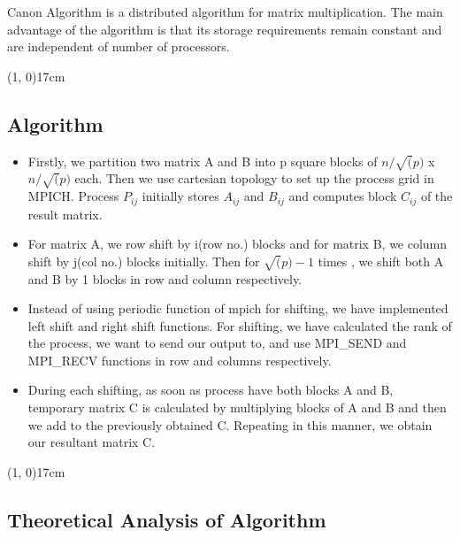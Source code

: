 \documentclass[10pt]{article}
\begin{document}
Canon Algorithm is a distributed algorithm for matrix multiplication. The main advantage of the algorithm is that its storage requirements remain constant and are independent of number of processors.

\begin{center}
	\line(1, 0){17cm}
\end{center}

\begin{center}
  \section*{Algorithm}
\end{center}

\begin{itemize} 

\item Firstly, we partition two matrix A and B into p square blocks of $n/\sqrt(p)$ x $n/\sqrt(p)$ each. Then we use cartesian topology to set up the process grid in MPICH. Process $P_{ij}$ initially stores $A_{ij}$ and $B_{ij}$ and computes block $C_{ij}$ of the result matrix.

\item For matrix A, we row shift by i(row no.) blocks and for matrix B, we column shift by j(col no.) blocks initially. Then for $\sqrt(p)-1 $ times , we shift both A and B by 1 blocks in row and column respectively.

\item Instead of using periodic function of mpich for shifting, we have implemented left shift and right shift functions. For shifting, we have calculated the rank of the process, we want to send our output to, and use MPI\_SEND and MPI\_RECV functions in row and columns respectively.

\item During each shifting, as soon as process have both blocks A and B, temporary matrix C is calculated by multiplying blocks of A and B and then we add to the previously obtained C. Repeating in this manner, we obtain our resultant matrix C.  

\end{itemize}

\begin{center}
	\line(1, 0){17cm}
\end{center}

\begin{center}
 \section*{Theoretical Analysis of Algorithm}
 \end{center}
\end{document}
